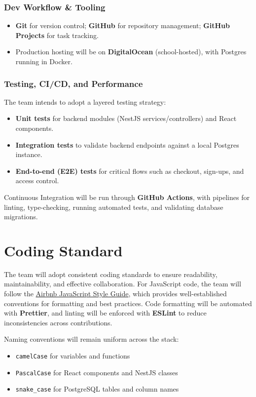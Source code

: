 \documentclass{article}
\begin{document}
\subsubsection*{Dev Workflow \& Tooling}
\begin{itemize}
  \item \textbf{Git} for version control; \textbf{GitHub} for repository management; \textbf{GitHub Projects} for task tracking.
  \item Production hosting will be on \textbf{DigitalOcean} (school-hosted), with Postgres running in Docker.
\end{itemize}

\subsubsection*{Testing, CI/CD, and Performance} 
The team intends to adopt a layered testing strategy:
\begin{itemize}
  \item \textbf{Unit tests} for backend modules (NestJS services/controllers) and React components.
  \item \textbf{Integration tests} to validate backend endpoints against a local Postgres instance.
  \item \textbf{End-to-end (E2E) tests} for critical flows such as checkout, sign-ups, and access control.
\end{itemize}
Continuous Integration will be run through \textbf{GitHub Actions}, with pipelines for linting, type-checking, running automated tests, and validating database migrations.

\section{Coding Standard}

The team will adopt consistent coding standards to ensure readability, maintainability, and effective collaboration. For JavaScript code, the team will follow the \href{https://github.com/airbnb/javascript}{Airbnb JavaScript Style Guide}, which provides well-established conventions for formatting and best practices. Code formatting will be automated with \textbf{Prettier}, and linting will be enforced with \textbf{ESLint} to reduce inconsistencies across contributions.

Naming conventions will remain uniform across the stack:
\begin{itemize}
  \item \texttt{camelCase} for variables and functions
  \item \texttt{PascalCase} for React components and NestJS classes
  \item \texttt{snake\_case} for PostgreSQL tables and column names
\end{itemize}
\end{document}
